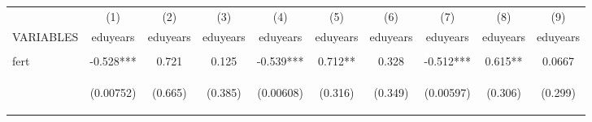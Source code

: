 \documentclass[]{article}
\begin{document}
\begin{center}
\begin{tabular}{lccccccccc} \hline
 & (1) & (2) & (3) & (4) & (5) & (6) & (7) & (8) & (9) \\
VARIABLES & eduyears & eduyears & eduyears & eduyears & eduyears & eduyears & eduyears & eduyears & eduyears \\ \hline
\vspace{4pt} & \begin{footnotesize}\end{footnotesize} & \begin{footnotesize}\end{footnotesize} & \begin{footnotesize}\end{footnotesize} & \begin{footnotesize}\end{footnotesize} & \begin{footnotesize}\end{footnotesize} & \begin{footnotesize}\end{footnotesize} & \begin{footnotesize}\end{footnotesize} & \begin{footnotesize}\end{footnotesize} & \begin{footnotesize}\end{footnotesize} \\
fert & -0.528*** & 0.721 & 0.125 & -0.539*** & 0.712** & 0.328 & -0.512*** & 0.615** & 0.0667 \\
\vspace{4pt} & \begin{footnotesize}(0.00752)\end{footnotesize} & \begin{footnotesize}(0.665)\end{footnotesize} & \begin{footnotesize}(0.385)\end{footnotesize} & \begin{footnotesize}(0.00608)\end{footnotesize} & \begin{footnotesize}(0.316)\end{footnotesize} & \begin{footnotesize}(0.349)\end{footnotesize} & \begin{footnotesize}(0.00597)\end{footnotesize} & \begin{footnotesize}(0.306)\end{footnotesize} & \begin{footnotesize}(0.299)\end{footnotesize} \\

\end{tabular}
\end{center}
\end{document}
